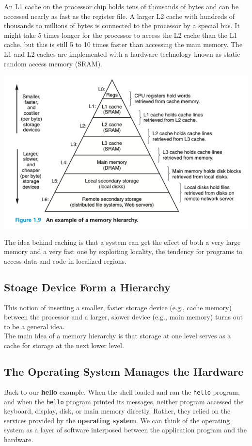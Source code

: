\documentclass[11pt]{article}
\begin{document}
An L1 cache on the processor chip holds tens of thousands of bytes and can be accessed nearly as fast as the register file. A larger L2 cache with hundreds of thousands to millions of bytes is connected to the processor by a special bus. It might take 5 times longer for the processor to access the L2 cache than the L1 cache, but this is still 5 to 10 times faster than accessing the main memory. The L1 and L2 caches are implemented with a hardware technology known as static random access memory (SRAM).\\

\begin{center}
\includegraphics[width=.9\linewidth]{pics/memory-hierarchy.png}
\end{center}

The idea behind caching is that a system can get the effect of both a very large memory and a very fast one by exploiting locality, the tendency for programs to access data and code in localized regions.\\


\subsection{Stoage Device Form a Hierarchy}
\label{sec:orgdc37745}
This notion of inserting a smaller, faster storage device (e.g., cache memory) between the processor and a larger, slower device (e.g., main memory) turns out to be a general idea.\\

The main idea of a memory hierarchy is that storage at one level serves as a cache for storage at the next lower level.\\

\subsection{The Operating System Manages the Hardware}
\label{sec:org1cec087}
Back to our \textbf{hello} example. When the shell loaded and ran the \texttt{hello} program, and when the \texttt{hello} program printed its messages, neither program accessed the keyboard, display, disk, or main memory directly. Rather, they relied on the services provided by the \textbf{operating system}. We can think of the operating system as a layer of software interposed between the application program and the hardware.\\
\end{document}
